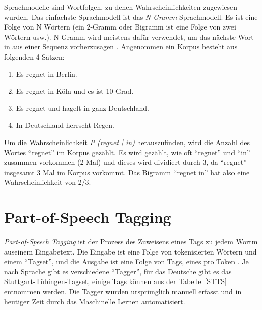 Sprachmodelle sind Wortfolgen, zu denen Wahrscheinlichkeiten zugewiesen wurden. Das einfachste Sprachmodell ist das \textit{N-Gramm} Sprachmodell. Es ist eine Folge von N Wörtern (ein 2-Gramm oder Bigramm ist eine Folge von zwei Wörtern usw.). N-Gramm wird meistens dafür verwendet, um das nächste Wort in aus einer Sequenz vorherzusagen \cite*[31]{Jurafskya}. Angenommen ein Korpus besteht aus folgenden 4 Sätzen:

\begin{enumerate}
    \item Es regnet in Berlin.
    \item Es regnet in Köln und es ist 10 Grad.
    \item Es regnet und hagelt in ganz Deutschland.
    \item In Deutschland herrscht Regen.
\end{enumerate}

Um die Wahrscheinlichkeit \textit{P (regnet | in)} herauszufinden, wird die Anzahl des Wortes \enquote{regnet} im Korpus gezählt. Es wird gezählt, wie oft \enquote{regnet} und \enquote{in} zusammen vorkommen (2 Mal) und dieses wird dividiert durch 3, da \enquote{regnet} insgesamt 3 Mal im Korpus vorkommt. Das Bigramm \enquote{regnet in} hat also eine Wahrscheinlichkeit von 2/3.

\section{Part-of-Speech Tagging}
\textit{Part-of-Speech Tagging} ist der Prozess des Zuweisens eines Tags zu jedem Wortm auseinem Eingabetext. Die Eingabe ist eine Folge von tokenisierten Wörtern und einem \enquote{Tagset}, und die Ausgabe ist eine Folge von Tags, eines pro Token \cite*[148]{Jurafskya}. Je nach Sprache gibt es verschiedene \enquote{Tagger}, für das Deutsche gibt es das Stuttgart-Tübingen-Tagset\cite*{tagger}, einige Tags können aus der Tabelle~\ref{STTS} entnommen werden. Die Tagger wurden ursprünglich manuell erfasst und in heutiger Zeit durch das Maschinelle Lernen automatisiert.



